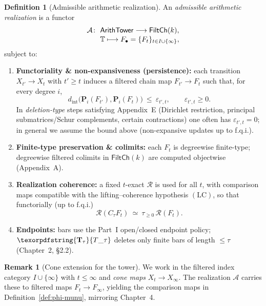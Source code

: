 \documentclass[11pt]{article}
\numberwithin{equation}{section}
\theoremstyle{plain}
\theoremstyle{definition}
\theoremstyle{remark}
\DeclareRobustCommand{\hyp}{\nobreakdash-}
\newcommand{\Rfun}{\mathcal{R}}
\theoremstyle{plain}
\theoremstyle{definition}
\numberwithin{equation}{section}
\theoremstyle{definition}
\newtheorem{definition}[theorem]{Definition}
\newtheorem{remark}[theorem]{Remark}
\DeclareRobustCommand{\FiltCh}[1]{\mathsf{FiltCh}(#1)}
\DeclareRobustCommand{\Ttau}{\texorpdfstring{\ensuremath{\mathbf{T}_{\tau}}}{T\_\tau}}
\DeclareRobustCommand{\LC}{\texorpdfstring{\ensuremath{\mathrm{(LC)}}}{(LC)}}
\numberwithin{equation}{section}
\theoremstyle{plain}
\theoremstyle{definition}
\theoremstyle{remark}
\providecommand{\Tfun}[1]{\mathbf{T}_{#1}}
\providecommand{\Ttau}{\Tfun{\tau}}
\providecommand{\n}{\unskip\space}
\begin{document}
\begin{definition}[Admissible arithmetic realization]\label{def:arith-real}
An \emph{admissible arithmetic realization} is a functor
\[
\begin{aligned}\n\mathcal{A}\colon\ & \mathsf{ArithTower}\longrightarrow \FiltCh{k},\\[-0.25em]\n& \mathbb{T}\longmapsto F_\bullet=\{F_t\}_{t\in I\cup\{\infty\}},\n\end{aligned}
\]
subject to:
\begin{enumerate}
  \item \textbf{Functoriality \& non\hyp expansiveness (persistence):} each transition \(X_{t'}\!\to X_{t}\) with \(t'\ge t\) induces a filtered chain map \(F_{t'}\!\to F_{t}\) such that, for every degree \(i\),
  \[
    d_{\mathrm{int}}\!\big(\mathbf{P}_i(F_{t'}),\mathbf{P}_i(F_{t})\big)\ \le\ \varepsilon_{t',t},\qquad \varepsilon_{t',t}\ge 0.
  \]
  In \emph{deletion\hyp type} steps satisfying Appendix~E (Dirichlet restriction, principal submatrices/Schur complements, certain contractions) one often has \(\varepsilon_{t',t}=0\); in general we assume the bound above (non\hyp expansive updates up to f.q.i.).
  \item \textbf{Finite\hyp type preservation \& colimits:} each \(F_t\) is degreewise finite\hyp type; degreewise filtered colimits in \(\FiltCh{k}\) are computed objectwise (Appendix~A).
  \item \textbf{Realization coherence:} a fixed \(t\)\hyp exact \(\Rfun\) is used for all \(t\), with comparison maps compatible with the lifting–coherence hypothesis \LC, so that functorially (up to f.q.i.)
  \[
    \Rfun(C_\tau F_t)\ \simeq\ \tau_{\ge 0}\,\Rfun(F_t).
  \]
  \item \textbf{Endpoints:} bars use the Part~I open/closed endpoint policy; \(\Ttau\) deletes only finite bars of length \(\le\tau\) (Chapter~2, §2.2).
\end{enumerate}
\end{definition}

\begin{remark}[Cone extension for the tower]\label{rk:cone-extension}
We work in the filtered index category \(I\cup\{\infty\}\) with \(t\le \infty\) and \emph{cone maps} \(X_t\to X_\infty\).
The realization \(\mathcal{A}\) carries these to filtered maps \(F_t\to F_\infty\), yielding the comparison maps in Definition~\ref{def:phi-munu}, mirroring Chapter~4.
\end{remark}
\end{document}
